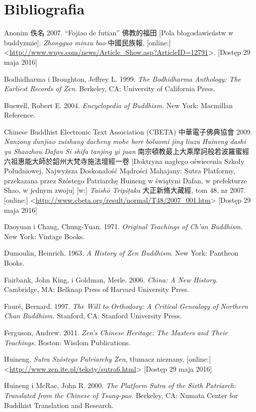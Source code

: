 \onecolumn
\chapter*{Bibliografia}
Anonim 佚名 2007. ``Fojiao de futian'' 佛教的福田 [Pola błogosławieństw w buddyzmie]. \textit{Zhongguo minzu bao} 中國民族報, [online:] <\url{http://www.wuys.com/news/Article_Show.asp?ArticleID=12791}>. [Dostęp 29 maja 2016]

Bodhidharma i Broughton, Jeffrey L. 1999. \textit{The Bodhidharma Anthology: The Earliest Records of Zen}. Berkeley, CA: University of California Press.

Buswell, Robert E. 2004. \textit{Encyclopedia of Buddhism.} New York: Macmillan Reference.

Chinese Buddhist Electronic Text Association (CBETA) 中華電子佛典協會 2009. \textit{Nanzong dunjiao zuishang dacheng mohe bore boluomi jing liuzu Huineng dashi yu Shaozhou Dafan Si shifa tanjing yi juan} 南宗頓教最上大乘摩訶般若波羅蜜經六祖惠能大師於韶州大梵寺施法壇經一卷 [Doktryna nagłego oświecenia Szkoły Południowej, Najwyższa Doskonałość Mądrości Mahajany: Sutra Platformy, przekazana przez Szóstego Patriarchę Huineng w świątyni Dafan, w prefekturze Shao, w jednym zwoju] [w:] \textit{Taishō Tripi\d{t}aka} 大正新脩大藏經, tom 48, nr 2007. [online:] <\url{http://www.cbeta.org/result/normal/T48/2007_001.htm}> [Dostęp 29 maja 2016]

Daoyuan i Chang, Chung-Yuan. 1971. \textit{Original Teachings of Ch'an Buddhism.} New York: Vintage Books.

Dumoulin, Heinrich. 1963. \textit{A History of Zen Buddhism}. New York: Pantheon Books.

Fairbank, John King, i Goldman, Merle. 2006. \textit{China: A New History.} Cambridge, MA: Belknap Press of Harvard University Press.

Fauré, Bernard. 1997. \textit{The Will to Orthodoxy: A Critical Genealogy of Northern Chan Buddhism.} Stanford, CA: Stanford University Press.

Ferguson, Andrew. 2011. \textit{Zen's Chinese Heritage: The Masters and Their Teachings.} Boston: Wisdom Publications.

Huineng, \textit{Sutra Szóstego Patriarchy Zen}, tłumacz nieznany, [online:] <\url{http://www.zen.ite.pl/teksty/sutra6.html}> [Dostęp 29 maja 2016]

Huineng i McRae, John R. 2000. \textit{The Platform Sutra of the Sixth Patriarch: Translated from the Chinese of Tsung-pao.} Berkeley, CA: Numata Center for Buddhist Translation and Research.

